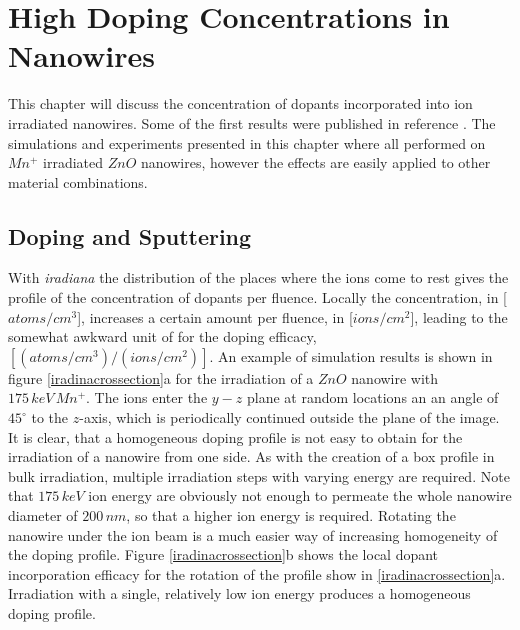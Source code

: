 \chapter{High Doping Concentrations in Nanowires}
\label{sec:high}

This chapter will discuss the concentration of dopants incorporated into ion irradiated nanowires. Some of the first results were published in reference \cite{johannes_enhanced_2014}. The simulations and experiments presented in this chapter where all performed on $Mn^+$ irradiated $ZnO$ nanowires, however the effects are easily applied to other material combinations.

\section{Doping and Sputtering}

With \emph{iradiana} the distribution of the places where the ions come to rest gives the profile of the concentration of dopants per fluence. Locally the concentration, in [$atoms/cm^{3}$], increases a certain amount per fluence, in [$ions/cm^{2}$], leading to the somewhat awkward unit of for the doping efficacy, $[(atoms/cm^{3})/(ions/cm^{2})]$.
An example of simulation results is shown in figure \ref{iradinacrossection}a for the irradiation of a $ZnO$ nanowire with $175\,keV\,Mn^+$. The ions enter the $y-z$ plane at random locations an an angle of $45^\circ$ to the $z$-axis, which is periodically continued outside the plane of the image. It is clear, that a homogeneous doping profile is not easy to obtain for the irradiation of a nanowire from one side. As with the creation of a box profile in bulk irradiation, multiple irradiation steps with varying energy are required. Note that $175\,keV$ ion energy are obviously not enough to permeate the whole nanowire diameter of $200\,nm$, so that a higher ion energy is required. Rotating the nanowire under the ion beam is a much easier way of increasing homogeneity of the doping profile. Figure \ref{iradinacrossection}b shows the local dopant incorporation efficacy for the rotation of the profile show in \ref{iradinacrossection}a. Irradiation with a single, relatively low ion energy produces a homogeneous doping profile. 
  
